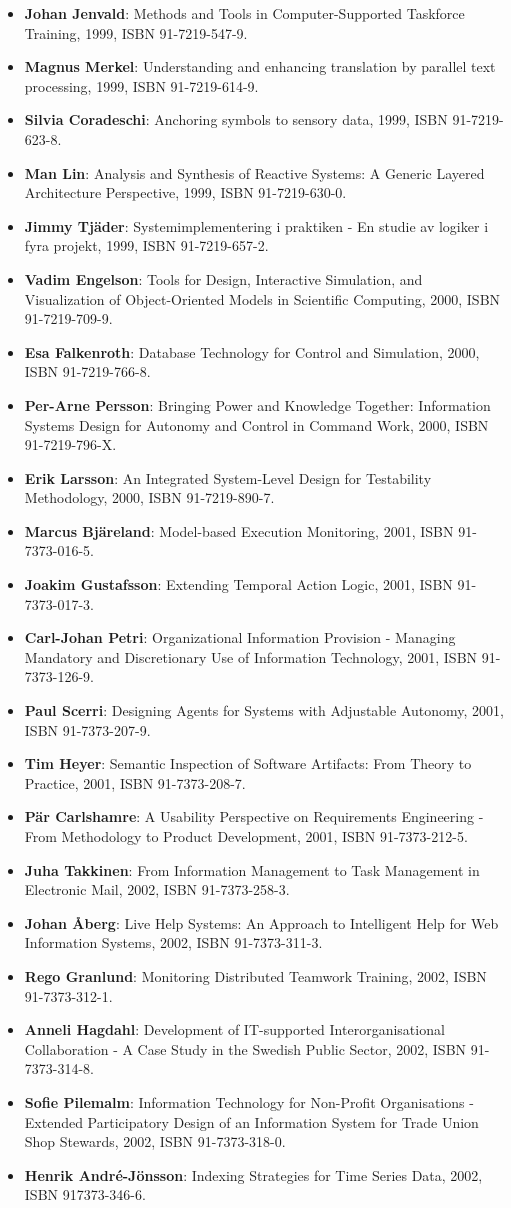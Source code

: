 \documentclass[a4paper,showtrims,twocolumn]{memoir}
\newenvironment{theses}
  {
    \begin{itemize}
      \setlength{\itemsep}{0.2em}
      \setlength{\parskip}{0em}
      \setlength{\parsep}{0em}
  }
  {
    \end{itemize}
  }
\newcommand{\thesis}[5]{\item[No. #1] \textbf{#2}: #3, #4, ISBN #5.}
\begin{document}
\begin{theses}
    \thesis{598}{Johan Jenvald}{Methods and Tools in Computer-Supported Taskforce Training}{1999}{91-7219-547-9}
    \thesis{607}{Magnus Merkel}{Understanding and enhancing translation by parallel text processing}{1999}{91-7219-614-9}
    \thesis{611}{Silvia Coradeschi}{Anchoring symbols to sensory data}{1999}{91-7219-623-8}
    \thesis{613}{Man Lin}{Analysis and Synthesis of Reactive Systems: A Generic Layered Architecture Perspective}{1999}{91-7219-630-0}
    \thesis{618}{Jimmy Tjäder}{Systemimplementering i praktiken - En studie av logiker i fyra projekt}{1999}{91-7219-657-2}
    \thesis{627}{Vadim Engelson}{Tools for Design, Interactive Simulation, and Visualization of Object-Oriented Models in Scientific Computing}{2000}{91-7219-709-9}
    \thesis{637}{Esa Falkenroth}{Database Technology for Control and Simulation}{2000}{91-7219-766-8}
    \thesis{639}{Per-Arne Persson}{Bringing Power and Knowledge Together: Information Systems Design for Autonomy and Control in Command Work}{2000}{91-7219-796-X}
    \thesis{660}{Erik Larsson}{An Integrated System-Level Design for Testability Methodology}{2000}{91-7219-890-7}
    \thesis{688}{Marcus Bjäreland}{Model-based Execution Monitoring}{2001}{91-7373-016-5}
    \thesis{689}{Joakim Gustafsson}{Extending Temporal Action Logic}{2001}{91-7373-017-3}
    \thesis{720}{Carl-Johan Petri}{Organizational Information Provision - Managing Mandatory and Discretionary Use of Information Technology}{2001}{91-7373-126-9}
    \thesis{724}{Paul Scerri}{Designing Agents for Systems with Adjustable Autonomy}{2001}{91-7373-207-9}
    \thesis{725}{Tim Heyer}{Semantic Inspection of Software Artifacts: From Theory to Practice}{2001}{91-7373-208-7}
    \thesis{726}{Pär Carlshamre}{A Usability Perspective on Requirements Engineering - From Methodology to Product Development}{2001}{91-7373-212-5}
    \thesis{732}{Juha Takkinen}{From Information Management to Task Management in Electronic Mail}{2002}{91-7373-258-3}
    \thesis{745}{Johan Åberg}{Live Help Systems: An Approach to Intelligent Help for Web Information Systems}{2002}{91-7373-311-3}
    \thesis{746}{Rego Granlund}{Monitoring Distributed Teamwork Training}{2002}{91-7373-312-1}
    \thesis{747}{Anneli Hagdahl}{Development of IT-supported Interorganisational Collaboration - A Case Study in the Swedish Public Sector}{2002}{91-7373-314-8}
    \thesis{749}{Sofie Pilemalm}{Information Technology for Non-Profit Organisations - Extended Participatory Design of an Information System for Trade Union Shop Stewards}{2002}{91-7373-318-0}
    \thesis{757}{Henrik André-Jönsson}{Indexing Strategies for Time Series Data}{2002}{917373-346-6}

\end{theses}
\end{document}
